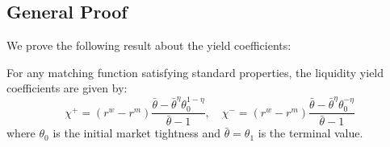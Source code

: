 \subsection{General Proof}
We prove the following result about the yield coefficients:
\begin{theorem}
For any matching function satisfying standard properties, the liquidity yield coefficients are given by:
\begin{equation}
\chi^+ = (r^w - r^m) \frac{\bar{\theta} - \bar{\theta}^{\eta}\theta_0^{1-\eta}}{\bar{\theta} - 1}, \quad \chi^- = (r^w - r^m) \frac{\bar{\theta} - \bar{\theta}^{\eta}\theta_0^{-\eta}}{\bar{\theta} - 1}
\end{equation}
where $\theta_0$ is the initial market tightness and $\bar{\theta} = \theta_1$ is the terminal value.
\end{theorem}

